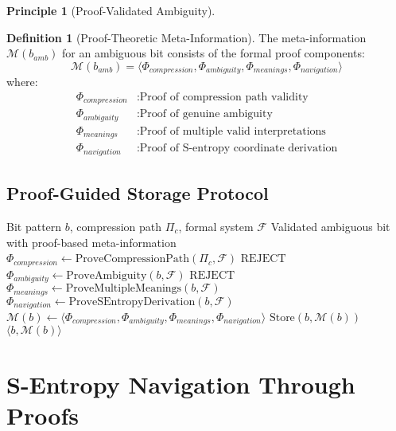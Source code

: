 \documentclass[12pt,a4paper]{article}
\theoremstyle{definition}
\newtheorem{definition}{Definition}
\newtheorem{principle}{Principle}
\begin{document}
\begin{principle}[Proof-Validated Ambiguity]
\begin{definition}[Proof-Theoretic Meta-Information]
The meta-information $\mathcal{M}(b_{amb})$ for an ambiguous bit consists of the formal proof components:
\begin{equation}
\mathcal{M}(b_{amb}) = \langle \Phi_{compression}, \Phi_{ambiguity}, \Phi_{meanings}, \Phi_{navigation} \rangle
\end{equation}
where:
\begin{align}
\Phi_{compression} &: \text{Proof of compression path validity} \\
\Phi_{ambiguity} &: \text{Proof of genuine ambiguity} \\
\Phi_{meanings} &: \text{Proof of multiple valid interpretations} \\
\Phi_{navigation} &: \text{Proof of S-entropy coordinate derivation}
\end{align}
\end{definition}

\subsection{Proof-Guided Storage Protocol}

\begin{algorithm}[H]
\caption{Proof-Validated Ambiguous Bit Storage}
\begin{algorithmic}[1]
\REQUIRE Bit pattern $b$, compression path $\Pi_c$, formal system $\mathcal{F}$
\ENSURE Validated ambiguous bit with proof-based meta-information
\STATE $\Phi_{compression} \leftarrow \text{ProveCompressionPath}(\Pi_c, \mathcal{F})$
    \RETURN $\text{REJECT}$ 
\ENDIF
\STATE $\Phi_{ambiguity} \leftarrow \text{ProveAmbiguity}(b, \mathcal{F})$
    \RETURN $\text{REJECT}$ 
\ENDIF
\STATE $\Phi_{meanings} \leftarrow \text{ProveMultipleMeanings}(b, \mathcal{F})$
\STATE $\Phi_{navigation} \leftarrow \text{ProveSEntropyDerivation}(b, \mathcal{F})$
\STATE $\mathcal{M}(b) \leftarrow \langle \Phi_{compression}, \Phi_{ambiguity}, \Phi_{meanings}, \Phi_{navigation} \rangle$
\STATE $\text{Store}(b, \mathcal{M}(b))$ 
\RETURN $\langle b, \mathcal{M}(b) \rangle$
\end{algorithmic}
\end{algorithm}

\section{S-Entropy Navigation Through Proofs}


\end{principle}
\end{document}

